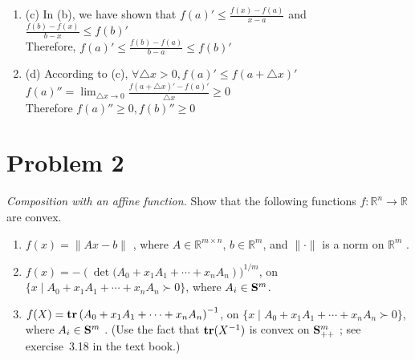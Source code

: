 \documentclass{article}
\newcommand{\reals}{{\mathbb{R}}}
\newcommand{\symm}{{\bf{S}}}
\newcommand{\Tr}{{\bf{tr}}}
\theoremstyle{definition}
\theoremstyle{definition}
\theoremstyle{remark}
\begin{document}
{{\begin{enumerate}
\begin{figure}[H]
    \end{figure}
    \item (c) In (b), we have shown that $f(a)'\leq \frac{f(x)-f(a)}{x-a}$ and $\frac{f(b)-f(x)}{b-x}\leq f(b)'$
    \\Therefore, $f(a)'\leq\frac{f(b)-f(a)}{b-a}\leq f(b)'$
    \item (d) According to (c), $\forall \bigtriangleup x>0, f(a)'\leq f(a+\bigtriangleup x)'$ 
    \\$f(a)''=\lim_{\bigtriangleup x\rightarrow 0}\frac{f(a+\bigtriangleup x)'-f(a)'}{\bigtriangleup x}\geq0$
    \\Therefore $f(a)''\geq0, f(b)''\geq0$
\end{enumerate}}}


\section*{Problem 2}\label{e-lin-frac-image}%
\emph{Composition with an affine function.}
Show that the following functions  $ f:\reals^n\rightarrow \reals $ are convex.
\begin{enumerate}
\item
 $ f(x) = \|Ax - b\| $ , where  $ A\in\reals^{m\times n} $, $ b\in\reals^m $, and  $ \|\cdot\| $  is a norm on  $ \reals^m $ .

\item
 $ f(x) = -\left( \det(A_0 + x_1 A_1 + \cdots + x_n A_n \right))^{1/m} $, on  $ \{x \;|\; A_0 + x_1 A_1 + \cdots + x_n A_n \succ 0\} $, where $ A_i \in \symm^m $.

\item
 $ f(X) = \Tr \left(A_0 + x_1A_1 + \cdots + x_n A_n \right)^{-1} $, on  $ \{x \;|\; A_0 + x_1 A_1 + \cdots + x_n A_n \succ 0 \} $, where $ A_i \in \symm^m $ .
(Use the fact that  $ \Tr (X^{-1})  $  is convex on $ \symm^m_{++} $ ; see exercise~3.18 in the text book.)
\end{enumerate}
\end{document}
